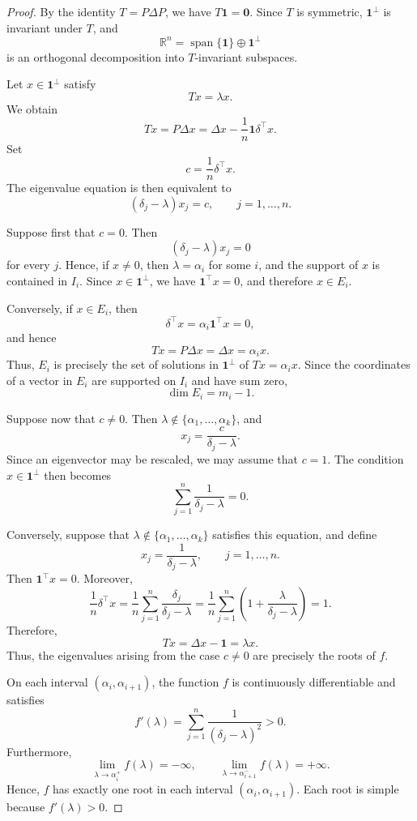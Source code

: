 \documentclass[10pt,a4paper]{amsart}
\begin{document}
\begin{proof}
By the identity $T=P\Delta P$, we have
$T\mathbf{1}=\mathbf{0}$. Since $T$ is symmetric,
$\mathbf{1}^{\perp}$ is invariant under $T$, and
\[
\mathbb{R}^n
=
\operatorname{span}\{\mathbf{1}\}
\oplus
\mathbf{1}^{\perp}
\]
is an orthogonal decomposition into $T$-invariant subspaces.

Let $x\in\mathbf{1}^{\perp}$ satisfy
\[
Tx=\lambda x.
\]
We obtain
\[
Tx
=
P\Delta x
=
\Delta x-\frac{1}{n}\mathbf{1}\delta^{\top}x.
\]
Set
\[
c=\frac{1}{n}\delta^{\top}x.
\]
The eigenvalue equation is then equivalent to
\[
(\delta_j-\lambda)x_j=c,
\qquad
j=1,\ldots,n.
\]

Suppose first that $c=0$. Then
\[
(\delta_j-\lambda)x_j=0
\]
for every $j$. Hence, if $x\neq 0$, then $\lambda=\alpha_i$ for some
$i$, and the support of $x$ is contained in $I_i$. Since
$x\in\mathbf{1}^{\perp}$, we have
$\mathbf{1}^{\top}x=0$, and therefore $x\in E_i$.

Conversely, if $x\in E_i$, then
\[
\delta^{\top}x
=
\alpha_i\mathbf{1}^{\top}x
=
0,
\]
and hence
\[
Tx
=
P\Delta x
=
\Delta x
=
\alpha_i x.
\]
Thus, $E_i$ is precisely the set of solutions in
$\mathbf{1}^{\perp}$ of $Tx=\alpha_i x$. Since the coordinates of a
vector in $E_i$ are supported on $I_i$ and have sum zero,
\[
\dim E_i=m_i-1.
\]

Suppose now that $c\neq 0$. Then
$\lambda\notin\{\alpha_1,\ldots,\alpha_k\}$, and
\[
x_j=\frac{c}{\delta_j-\lambda}.
\]
Since an eigenvector may be rescaled, we may assume that $c=1$.
The condition $x\in\mathbf{1}^{\perp}$ then becomes
\[
\sum_{j=1}^{n}\frac{1}{\delta_j-\lambda}=0.
\]

Conversely, suppose that
$\lambda\notin\{\alpha_1,\ldots,\alpha_k\}$ satisfies this equation,
and define
\[
x_j=\frac{1}{\delta_j-\lambda},
\qquad
j=1,\ldots,n.
\]
Then $\mathbf{1}^{\top}x=0$. Moreover,
\[
\frac{1}{n}\delta^{\top}x
=
\frac{1}{n}
\sum_{j=1}^{n}\frac{\delta_j}{\delta_j-\lambda}
=
\frac{1}{n}
\sum_{j=1}^{n}
\left(
1+\frac{\lambda}{\delta_j-\lambda}
\right)
=
1.
\]
Therefore,
\[
Tx
=
\Delta x-\mathbf{1}
=
\lambda x.
\]
Thus, the eigenvalues arising from the case $c\neq 0$ are precisely the
roots of $f$.

On each interval $(\alpha_i,\alpha_{i+1})$, the function $f$ is
continuously differentiable and satisfies
\[
f'(\lambda)
=
\sum_{j=1}^{n}\frac{1}{(\delta_j-\lambda)^2}
>0.
\]
Furthermore,
\[
\lim_{\lambda\to\alpha_i^+}f(\lambda)=-\infty,
\qquad
\lim_{\lambda\to\alpha_{i+1}^-}f(\lambda)=+\infty.
\]
Hence, $f$ has exactly one root in each interval
$(\alpha_i,\alpha_{i+1})$. Each root is simple because
$f'(\lambda)>0$.


\end{proof}
\end{document}

